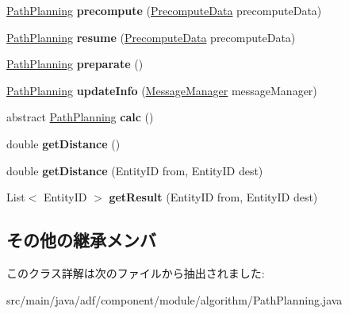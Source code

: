 \begin{DoxyCompactItemize}
\hyperlink{classadf_1_1component_1_1module_1_1algorithm_1_1PathPlanning}{Path\+Planning} {\bfseries precompute} (\hyperlink{classadf_1_1agent_1_1precompute_1_1PrecomputeData}{Precompute\+Data} precompute\+Data)
\item 
\hypertarget{classadf_1_1component_1_1module_1_1algorithm_1_1PathPlanning_a0102328d97aa36805913402296f4db8a}{}\label{classadf_1_1component_1_1module_1_1algorithm_1_1PathPlanning_a0102328d97aa36805913402296f4db8a} 
\hyperlink{classadf_1_1component_1_1module_1_1algorithm_1_1PathPlanning}{Path\+Planning} {\bfseries resume} (\hyperlink{classadf_1_1agent_1_1precompute_1_1PrecomputeData}{Precompute\+Data} precompute\+Data)
\item 
\hypertarget{classadf_1_1component_1_1module_1_1algorithm_1_1PathPlanning_a743d695590022ce81f825d7d08c9f0ea}{}\label{classadf_1_1component_1_1module_1_1algorithm_1_1PathPlanning_a743d695590022ce81f825d7d08c9f0ea} 
\hyperlink{classadf_1_1component_1_1module_1_1algorithm_1_1PathPlanning}{Path\+Planning} {\bfseries preparate} ()
\item 
\hypertarget{classadf_1_1component_1_1module_1_1algorithm_1_1PathPlanning_ac655c99277aa2079c3afe3db65b03042}{}\label{classadf_1_1component_1_1module_1_1algorithm_1_1PathPlanning_ac655c99277aa2079c3afe3db65b03042} 
\hyperlink{classadf_1_1component_1_1module_1_1algorithm_1_1PathPlanning}{Path\+Planning} {\bfseries update\+Info} (\hyperlink{classadf_1_1agent_1_1communication_1_1MessageManager}{Message\+Manager} message\+Manager)
\item 
\hypertarget{classadf_1_1component_1_1module_1_1algorithm_1_1PathPlanning_ae3ab0f57c70ca6d4517a8941bbcba3b4}{}\label{classadf_1_1component_1_1module_1_1algorithm_1_1PathPlanning_ae3ab0f57c70ca6d4517a8941bbcba3b4} 
abstract \hyperlink{classadf_1_1component_1_1module_1_1algorithm_1_1PathPlanning}{Path\+Planning} {\bfseries calc} ()
\item 
\hypertarget{classadf_1_1component_1_1module_1_1algorithm_1_1PathPlanning_a7ee5ef884fcde62b8403ffca4c615dcd}{}\label{classadf_1_1component_1_1module_1_1algorithm_1_1PathPlanning_a7ee5ef884fcde62b8403ffca4c615dcd} 
double {\bfseries get\+Distance} ()
\item 
\hypertarget{classadf_1_1component_1_1module_1_1algorithm_1_1PathPlanning_ab7eb7f771e77944831cc85dd7e3646ad}{}\label{classadf_1_1component_1_1module_1_1algorithm_1_1PathPlanning_ab7eb7f771e77944831cc85dd7e3646ad} 
double {\bfseries get\+Distance} (Entity\+ID from, Entity\+ID dest)
\item 
\hypertarget{classadf_1_1component_1_1module_1_1algorithm_1_1PathPlanning_a57bc80f3f2c042cf1a2b4a67781693c1}{}\label{classadf_1_1component_1_1module_1_1algorithm_1_1PathPlanning_a57bc80f3f2c042cf1a2b4a67781693c1} 
List$<$ Entity\+ID $>$ {\bfseries get\+Result} (Entity\+ID from, Entity\+ID dest)
\end{DoxyCompactItemize}
\subsection*{その他の継承メンバ}


このクラス詳解は次のファイルから抽出されました\+:\begin{DoxyCompactItemize}
\item 
src/main/java/adf/component/module/algorithm/Path\+Planning.\+java\end{DoxyCompactItemize}
